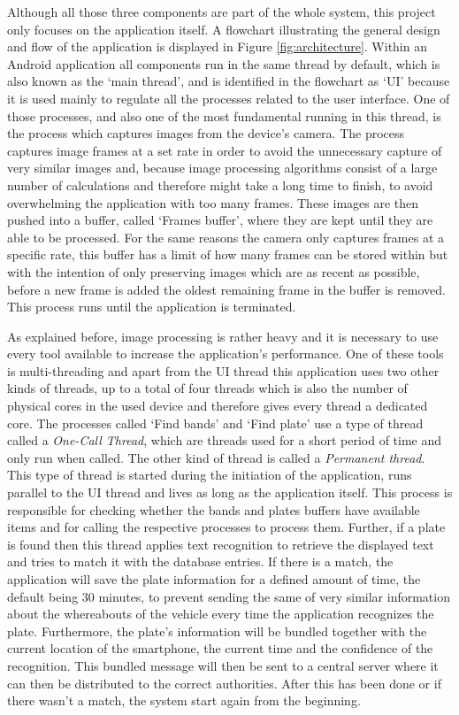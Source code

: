 Although all those three components are part of the whole system, this project only focuses on the application itself. A flowchart illustrating the general design and flow of the application is displayed in Figure \ref{fig:architecture}. Within an Android application all components run in the same thread by default, which is also known as the `main thread', and is identified in the flowchart as `UI' because it is used mainly to regulate all the processes related to the user interface. One of those processes, and also one of the most fundamental running in this thread, is the process which captures images from the device's camera. The process captures image frames at a set rate in order to avoid the unnecessary capture of very similar images and, because image processing algorithms consist of a large number of calculations and therefore might take a long time to finish, to avoid overwhelming the application with too many frames. These images are then pushed into a buffer, called `Frames buffer', where they are kept until they are able to be processed. For the same reasons the camera only captures frames at a specific rate, this buffer has a limit of how many frames can be stored within but with the intention of only preserving images which are as recent as possible, before a new frame is added the oldest remaining frame in the buffer is removed. This process runs until the application is terminated.

As explained before, image processing is rather heavy and it is necessary to use every tool available to increase the application's performance. One of these tools is multi-threading and apart from the UI thread this application uses two other kinds of threads, up to a total of four threads which is also the number of physical cores in the used device and therefore gives every thread a dedicated core. The processes called `Find bands' and `Find plate' use a type of thread called a \emph{One-Call Thread}, which are threads used for a short period of time and only run when called. The other kind of thread is called a \emph{Permanent thread}. This type of thread is started during the initiation of the application, runs parallel to the UI thread and lives as long as the application itself. This process is responsible for checking whether the bands and plates buffers have available items and for calling the respective processes to process them. Further, if a plate is found then this thread applies text recognition to retrieve the displayed text and tries to match it with the database entries. If there is a match, the application will save the plate information for a defined amount of time, the default being 30 minutes, to prevent sending the same of very similar information about the whereabouts of the vehicle every time the application recognizes the plate. Furthermore, the plate's information will be bundled together with the current location of the smartphone, the current time and the confidence of the recognition. This bundled message will then be sent to a central server where it can then be distributed to the correct authorities. After this has been done or if there wasn't a match, the system start again from the beginning.


